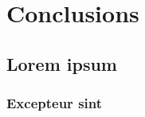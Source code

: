 \documentclass{./llncs2e/llncs}
\begin{document}

% 
% 

\section{Conclusions}

\subsection{Lorem ipsum}

\subsubsection{Excepteur sint}














% 
% 




% 
% 

 

\end{document}

